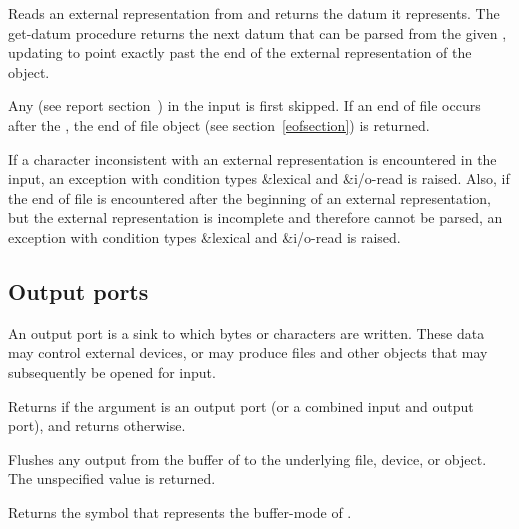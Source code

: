 \begin{entry}{%
}
 
Reads an external representation from  and returns the
datum it represents.  The {\cf get-datum} procedure returns the next
datum that can be parsed from the given , updating
 to point exactly past the end of the external
representation of the object.

Any 
(see report section~) in
the input is first skipped.  If an end of file occurs after the
, the end of file object (see
section~\ref{eofsection}) is returned.

If a character inconsistent with an external representation is
encountered in the input, an exception with condition types
{\cf\&lexical} and {\cf\&i/o-read} is raised.
Also, if the end of file is encountered
after the beginning of an external representation, but the external
representation is incomplete and therefore cannot be parsed, an exception
with condition types {\cf\&lexical} and {\cf\&i/o-read} is raised.
\end{entry}

\subsection{Output ports}

An output port is a sink to which bytes or characters are written.
These data may control
external devices, or may produce files and other objects that may
subsequently be opened for input.

\begin{entry}{%
}
   
Returns \schtrue{} if the argument is an output port (or a
combined input and output port), and returns \schfalse{} otherwise.
\end{entry}   

\begin{entry}{%
}
   
Flushes any output from the buffer of  to the
underlying file, device, or object. The unspecified value is returned.
\end{entry}

\begin{entry}{%
}
   
Returns the symbol that represents the buffer-mode of
.
\end{entry}

